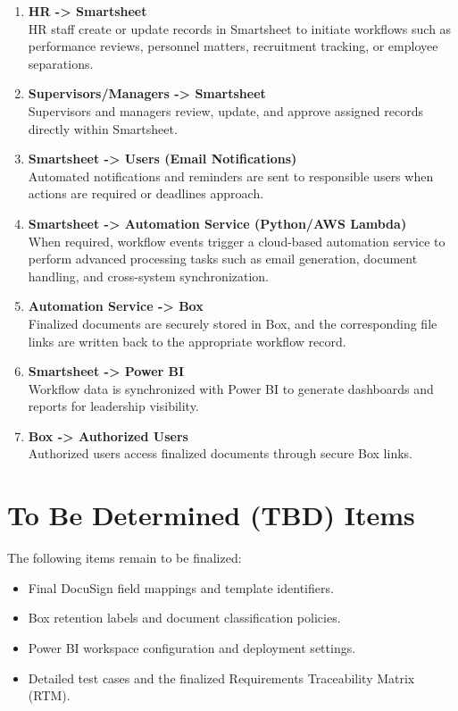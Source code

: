 \documentclass[12pt]{article}
\begin{document}
\begin{enumerate}
    \item \textbf{HR -> Smartsheet} \\
    HR staff create or update records in Smartsheet to initiate workflows such as performance reviews, personnel matters, recruitment tracking, or employee separations.

    \item \textbf{Supervisors/Managers -> Smartsheet} \\
    Supervisors and managers review, update, and approve assigned records directly within Smartsheet.

    \item \textbf{Smartsheet -> Users (Email Notifications)} \\
    Automated notifications and reminders are sent to responsible users when actions are required or deadlines approach.

    \item \textbf{Smartsheet -> Automation Service (Python/AWS Lambda)} \\
    When required, workflow events trigger a cloud-based automation service to perform advanced processing tasks such as email generation, document handling, and cross-system synchronization.

    \item \textbf{Automation Service -> Box} \\
    Finalized documents are securely stored in Box, and the corresponding file links are written back to the appropriate workflow record.

    \item \textbf{Smartsheet -> Power BI} \\
    Workflow data is synchronized with Power BI to generate dashboards and reports for leadership visibility.

    \item \textbf{Box -> Authorized Users} \\
    Authorized users access finalized documents through secure Box links.
\end{enumerate}

\section{To Be Determined (TBD) Items}

The following items remain to be finalized:

\begin{itemize}
    \item Final DocuSign field mappings and template identifiers.
    \item Box retention labels and document classification policies.
    \item Power BI workspace configuration and deployment settings.
    \item Detailed test cases and the finalized Requirements Traceability Matrix (RTM).
\end{itemize}
\end{document}
